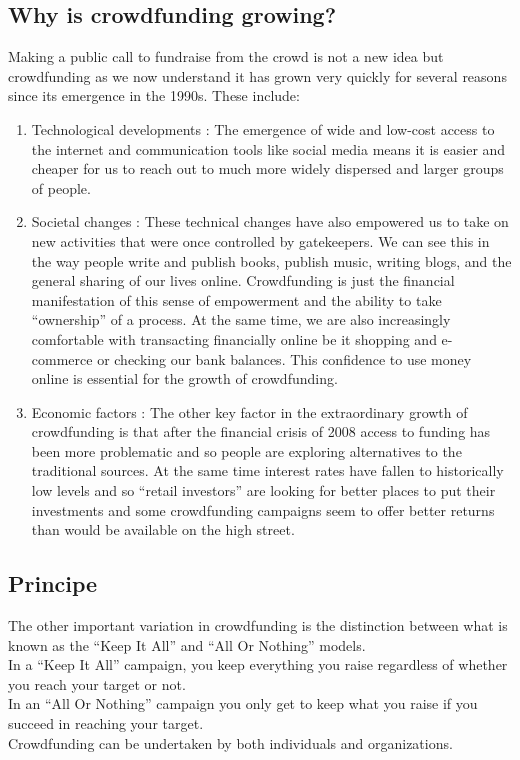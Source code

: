 \subsection*{ Why is crowdfunding growing? }
Making a public call to fundraise from the crowd is not a new idea but crowdfunding as we now understand it has grown very quickly for several reasons since its emergence in the 1990s. These include:
\begin{enumerate}
      \item
            Technological developments : The emergence of wide and low-cost access to the internet and communication tools like social media means it is easier and cheaper for us to reach out to much more widely dispersed and larger groups of people.
      \item
            Societal changes : These technical changes have also empowered us to take on new activities that were once controlled by gatekeepers. We can see this in the way people write and publish books, publish music, writing blogs, and the general sharing of our lives online. Crowdfunding is just the financial manifestation of this sense of empowerment and the ability to take “ownership” of a process. At the same time, we are also increasingly comfortable with transacting financially online be it shopping and e-commerce or checking our bank balances. This confidence to use money online is essential for the growth of crowdfunding.
      \item
            Economic factors : The other key factor in the extraordinary growth of crowdfunding is that after the financial crisis of 2008 access to funding has been more problematic and so people are exploring alternatives to the traditional sources. At the same time interest rates have fallen to historically low levels and so “retail investors” are looking for better places to put their investments and some crowdfunding campaigns seem to offer better returns than would be available on the high street.
\end{enumerate}

\subsection*{Principe }
The other important variation in crowdfunding is the distinction between what is known as the “Keep It All” and “All Or Nothing” models.\\
In a “Keep It All” campaign, you keep everything you raise regardless of whether you reach your target or not.\\
In an “All Or Nothing” campaign you only get to keep what you raise if you succeed in reaching your target.\\
Crowdfunding can be undertaken by both individuals and organizations.



